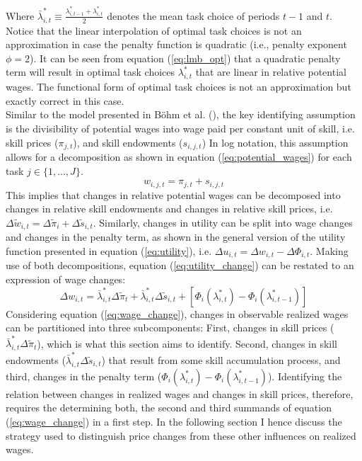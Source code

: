 \documentclass[../main.tex]{subfiles}
\begin{document}
Where $\bar{\lambda}_{i,t}^* \equiv \frac{\lambda_{i,t-1}^* + \lambda_{i,t}^*}{2}$ denotes the mean task choice of periods $t-1$ and $t$. Notice that the linear interpolation of optimal task choices is not an approximation in case the penalty function is quadratic (i.e., penalty exponent $\phi = 2$). It can be seen from equation (\ref{eq:lmb_opt}) that a quadratic penalty term will result in optimal task choices $\lambda_{i,t}^*$ that are linear in relative potential wages. The functional form of optimal task choices is not an approximation but exactly correct in this case.
\\ 
Similar to the model presented in Böhm et al. (\citeyear{bohm2019occupation}), the key identifying assumption is the divisibility of potential wages into wage paid per constant unit of skill, i.e. skill prices ($\pi_{j,t}$), and skill endowments ($s_{i,j,t}$) In log notation, this assumption allows for a decomposition as shown in equation (\ref{eq:potential_wages}) for each task $j \in \{1, ...,J\}$.
\begin{equation} \label{eq:potential_wages}
	w_{i,j,t} = \pi_{j,t} + s_{i,j,t} 
\end{equation}
This implies that changes in relative potential wages can be decomposed into changes in relative skill endowments and changes in relative skill prices, i.e. $\Delta \tilde{w}_{i,t} = \Delta \tilde{\pi}_i + \Delta \tilde{s}_{i,t}$. Similarly, changes in utility can be split into wage changes and changes in the penalty term, as shown in the general version of the utility function presented in equation (\ref{eq:utility}), i.e. $\Delta u_{i,t} = \Delta w_{i,t} - \Delta \Phi_{i,t}$. Making use of both decompositions, equation (\ref{eq:utility_change}) can be restated to an expression of wage changes:
\begin{equation} \label{eq:wage_change}
 	\Delta w_{i,t} = \bar{\lambda}^*_{i,t} \Delta \tilde{\pi}_{t} + \bar{\lambda}^*_{i,t} \Delta \tilde{s}_{i,t} + \left[ \Phi_{i}(\lambda_{i,t}^*) - \Phi_{i}(\lambda_{i,t-1}^*) \right]
\end{equation} 
Considering equation (\ref{eq:wage_change}), changes in observable realized wages can be partitioned into three subcomponents: First, changes in skill prices ($\bar{\lambda}^*_{i,t} \Delta \tilde{\pi}_{t}$), which is what this section aims to identify. Second, changes in skill endowments ($\bar{\lambda}^*_{i,t} \Delta \tilde{s}_{i,t}$) that result from some skill accumulation process, and third, changes in the penalty term ($\Phi_{i}(\lambda_{i,t}^*) - \Phi_{i}(\lambda_{i,t-1}^*)$). Identifying the relation between changes in realized wages and changes in skill prices, therefore, requires the determining both, the second and third summands of equation (\ref{eq:wage_change}) in a first step. In the following section I hence discuss the strategy used to distinguish price changes from these other influences on realized wages.
\end{document}
